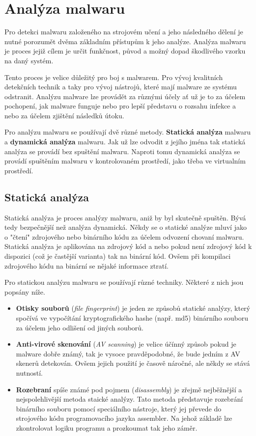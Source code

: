 \section{Analýza malwaru}
Pro detekci malwaru založeného na strojovém učení a jeho následného dělení je nutné porozumět dvěma základním přístupům k jeho analýze. Analýza malwaru je proces jejiž cílem je určit funkčnost, původ a možný dopad škodlivého vzorku na daný systém.

Tento proces je velice důležitý pro boj s malwarem. Pro vývoj kvalitních detekčních technik a taky pro vývoj nástrojů, které mají malware ze systému odstranit. Analýzu malware lze provádět za různými účely ať už je to za účelem pochopení, jak malware funguje
nebo pro lepší představu o rozsahu infekce a nebo za účelem zjištění následků útoku.

Pro analýzu malwaru se používají dvě různé metody. \textbf{Statická analýza} malwaru a \textbf{dynamická analýza} malwaru. 
Jak už lze odvodit z jejího jména tak statická analýza se provádí bez spuštění malwaru. Naproti tomu dynamická analýza se provádí spuštěním malwaru v kontrolovaném prostředí, 
jako třeba ve virtualním prostředí.

\subsection*{Statická analýza}
Statická analýza je proces analýzy malwaru, aniž by byl skutečně spuštěn. Bývá tedy bezpečnější než analýza dynamická. Někdy se o statické analýze mluví jako o "čtení" zdrojového nebo binárního kódu za účelem
odvození chovaní malwaru. Statická analýza je aplikována na zdrojový kód a nebo pokud není zdrojový kód k dispozici (což je častější varianta) tak na binární kód. Ovšem při kompilaci zdrojového kódu na binární se nějaké informace ztratí.

Pro statickou analýzu malwaru se používají různé techniky. Některé z nich jsou popsány níže.
\begin{itemize}
    \item \textbf{Otisky souborů} (\textit{file fingerprint}) je jeden ze způsobů statické analýzy, který spočívá ve vypočítání kryptografického hashe (např. md5) binárního souboru za účelem jeho odlišení od jiných souborů.
    \item \textbf{Anti-virové skenování} (\textit{AV scanning}) je velice účínný způsob pokud je malware dobře známý, tak je vysoce pravděpodobné, že bude jedním z AV skenerů detekován. Ovšem jejich použití je časově náročné, ale někdy se stává nutností.
    \item \textbf{Rozebraní} spíše známé pod pojmem (\textit{disassembly}) je zřejmě nejběžnější a nejspolehlivější metoda staické analýzy. Tato metoda představuje rozebrání binárního souboru pomocí speciálního nástroje, který jej převede do strojového kódu programovacího jazyka assembler. Na jehož základě lze zkontrolovat logiku programu a prozkoumat tak jeho záměr. 
\end{itemize}

